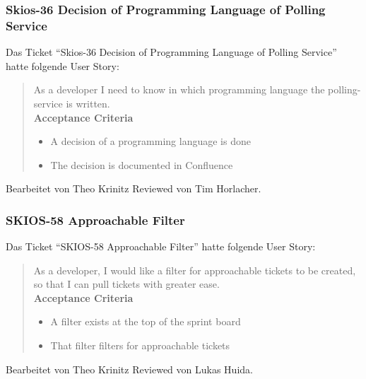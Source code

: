 \subsubsection{Skios-36 Decision of Programming Language of Polling Service}
Das Ticket \enquote{Skios-36 Decision of Programming Language of Polling Service} hatte folgende User Story:
\begin{quotation}
    As a developer I need to know in which programming language the polling-service is written. \\
    \textbf{Acceptance Criteria}
    \begin{itemize}
        \item A decision of a programming language is done
        \item The decision is documented in Confluence
    \end{itemize}
\end{quotation}
Bearbeitet von Theo Krinitz
Reviewed von Tim Horlacher.

\subsubsection{SKIOS-58 Approachable Filter}
Das Ticket \enquote{SKIOS-58 Approachable Filter} hatte folgende User Story:
\begin{quotation}
    As a developer, I would like a filter for approachable tickets to be created, so that I can pull tickets with greater ease.\\
    \textbf{Acceptance Criteria}
    \begin{itemize}
        \item A filter exists at the top of the sprint board
        \item That filter filters for approachable tickets
    \end{itemize}
\end{quotation}
Bearbeitet von Theo Krinitz
Reviewed von Lukas Huida.


